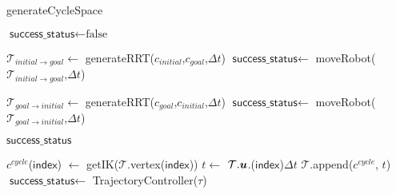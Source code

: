 \begin{algorithm}
  \caption{generateCycleSpace}
  \label{algo:cycle_space} 
  \DontPrintSemicolon
  
    { 
    $ \textsf{success\_status} \gets \text{false}$\;\label{ln:cs1}
     {
       $\mathcal{T}_{initial\rightarrow goal} \gets$ generateRRT($c_{initial}$,$c_{goal}$,$\Delta t $)\;\label{ln:cs_RRT1}
       $\textsf{success\_status} \gets$ 
            moveRobot($\mathcal{T}_{initial\rightarrow goal}$,$\Delta t$)\;\label{ln:cs_move_robot1}
      
      { 
          $\mathcal{T}_{goal\rightarrow initial} \gets$ generateRRT($c_{goal}$,$c_{initial}$,$\Delta t $)\;\label{ln:cs_RRT2}
          $\textsf{success\_status} \gets$ 
            moveRobot($\mathcal{T}_{goal \rightarrow initial}$,$\Delta t$)\;\label{ln:cs_move_robot2}
      }
     }
    \KwRet $\textsf{success\_status}$\;
    }

    {
      {
        $c^{cycle}$($\textsf{index}$) $\gets$ getIK($\mathcal{T}$.vertex($\textsf{index}$))\;
        $t \gets$ $\mathcal{T}.\vb*{u}$.($\textsf{index}$)$\Delta t$\;
        $\mathcal{T}$.append($c^{cycle}$, $t$)
      }
      $\textsf{success\_status} \gets$ TrajectoryController($\tau$)\;

    }
\end{algorithm}

